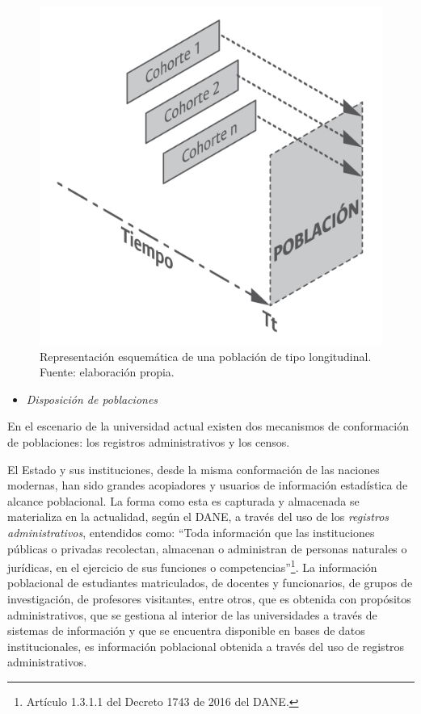 \documentclass[
]{book}
\providecommand{\tightlist}{%
  \setlength{\itemsep}{0pt}\setlength{\parskip}{0pt}}
\begin{document}
\begin{figure}

{\centering \includegraphics[width=0.75\linewidth]{imagenes/F_20} 

}

\caption{Representación esquemática de una población de tipo longitudinal. Fuente: elaboración propia.}\label{fig:fig20}
\end{figure}

\begin{itemize}
\tightlist
\item
  \emph{Disposición de poblaciones}
\end{itemize}

En el escenario de la universidad actual existen dos mecanismos de conformación de poblaciones: los registros administrativos y los censos.

El Estado y sus instituciones, desde la misma conformación de las naciones modernas, han sido grandes acopiadores y usuarios de información estadística de alcance poblacional. La forma como esta es capturada y almacenada se materializa en la actualidad, según el DANE, a través del uso de los \emph{registros administrativos}, entendidos como: ``Toda información que las instituciones públicas o privadas recolectan, almacenan o administran de personas naturales o jurídicas, en el ejercicio de sus funciones o competencias''\footnote{Artículo 1.3.1.1 del Decreto 1743 de 2016 del DANE.}. La información poblacional de estudiantes matriculados, de docentes y funcionarios, de grupos de investigación, de profesores visitantes, entre otros, que es obtenida con propósitos administrativos, que se gestiona al interior de las universidades a través de sistemas de información y que se encuentra disponible en bases de datos institucionales, es información poblacional obtenida a través del uso de registros administrativos.
\end{document}
